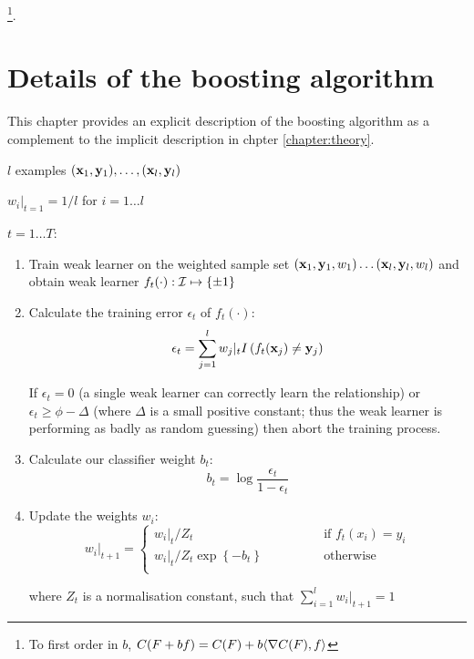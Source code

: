  \footnote{To first order in $b$, $C(F+bf) = C(F) +
b \langle {\nabla C(F)} , {f} \rangle$}.





\chapter{Details of the boosting algorithm}
\label{chapter:boosting details}

This chapter provides an explicit description of the boosting
algorithm as a complement to the implicit description in chpter
\ref{chapter:theory}.

\par

 $l$ examples $(\mathbf{x}_1, \mathbf{y}_1), \ldots, (\mathbf{x}_l,
\mathbf{y}_l)$
\par
{} $w_i|_{t=1} = 1/l$ for $i=1 \ldots l$
\par
{} $t=1 \ldots T$:


\begin{enumerate}

\item	Train weak learner on the weighted sample set 
	$(\mathbf{x}_1, \mathbf{y}_1, w_1) \ldots (\mathbf{x}_l, \mathbf{y}_l, w_l)$
	and obtain weak learner $f_t(\cdot) : \mathcal{I} \mapsto \{\pm 1\}$

\item	Calculate the training error $\epsilon_t$ of $f_t(\cdot)$:
	\begin{equation}
	\epsilon_t = \sum_{j=1}^l w_j |_t 
	I \left( f_t(\mathbf{x}_j) \neq \mathbf{y}_j\right)
	\end{equation}

	If $\epsilon_t = 0$ (a single weak learner can correctly learn
	the relationship) or $\epsilon_t \geq \phi - \Delta$ (where
	$\Delta$ is a small positive constant; thus the weak
	learner is performing as badly as random guessing) then abort
	the training process.

\item	Calculate our classifier weight $b_t$:
	\begin{equation}
	b_t = \log \frac{\epsilon_t}{1 - \epsilon_t}
	\end{equation}

\item	Update the weights $w_i$:
	\begin{equation}
	w_i|_{t+1} = \left\{
	\begin{array}{cl}
		w_i|_t / Z_t	&	\qquad \qquad \mbox{if
		$f_t(x_i) = y_i$} \\
		w_i|_t / Z_t \exp \left\{ -b_t \right\} & \qquad \qquad
		\mbox{otherwise} \\
	\end{array} \right.
	\end{equation}

	where $Z_t$ is a normalisation constant, such that
	$\sum_{i=1}^{l} w_i|_{t+1} = 1$
\end{enumerate}

